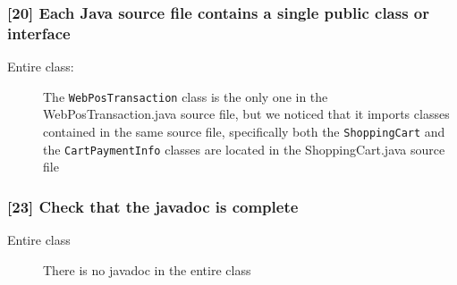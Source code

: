 \subsubsection*{[20] Each Java source file contains a single public class or interface}
\begin{description}
	\item[Entire class:] The {\tt WebPosTransaction} class is the only one in the WebPosTransaction.java source file, but we noticed that it imports classes contained in the same source file, specifically both the {\tt ShoppingCart} and the {\tt CartPaymentInfo} classes are located in the ShoppingCart.java source file
\end{description}

\subsubsection*{[23] Check that the javadoc is complete}
\begin{description}
	\item[Entire class] There is no javadoc in the entire class
\end{description}


